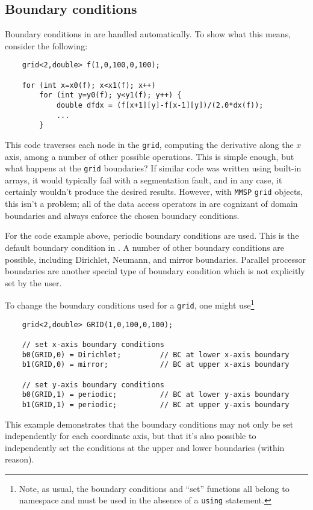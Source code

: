 \subsection{Boundary conditions}
Boundary conditions in \MMSP are handled automatically.  To show what this means, consider the following:
\begin{shadebox}
\begin{verbatim}
    grid<2,double> f(1,0,100,0,100);

    for (int x=x0(f); x<x1(f); x++)
        for (int y=y0(f); y<y1(f); y++) {
            double dfdx = (f[x+1][y]-f[x-1][y])/(2.0*dx(f));
            ...
        }
\end{verbatim}
\end{shadebox}
This code traverses each node in the {\tt grid}, computing the derivative along the $x$ axis, among a number of other possible operations.  This is simple enough, but what happens at the {\tt grid} boundaries?  If similar code was written using built-in arrays, it would typically fail with a segmentation fault, and in any case, it certainly wouldn't produce the desired results.  However, with {\tt MMSP} {\tt grid} objects, this isn't a problem; all of the data access operators in \MMSP are cognizant of domain boundaries and always enforce the chosen boundary conditions.

For the code example above, periodic boundary conditions are used.  This is the default boundary condition in \MMSP.  A number of other boundary conditions are possible, including Dirichlet, Neumann, and mirror boundaries.  Parallel processor boundaries are another special type of boundary condition which is not explicitly set by the user.

To change the boundary conditions used for a {\tt grid}, one might use\footnote{Note, as usual, the boundary conditions and ``set'' functions all belong to namespace \MMSP and must be used in the absence of a {\tt using} statement.}
\begin{shadebox}
\begin{verbatim}
    grid<2,double> GRID(1,0,100,0,100);

    // set x-axis boundary conditions
    b0(GRID,0) = Dirichlet;         // BC at lower x-axis boundary
    b1(GRID,0) = mirror;            // BC at upper x-axis boundary

    // set y-axis boundary conditions
    b0(GRID,1) = periodic;          // BC at lower y-axis boundary
    b1(GRID,1) = periodic;          // BC at upper y-axis boundary
\end{verbatim}
\end{shadebox}
This example demonstrates that the boundary conditions may not only be set independently for each coordinate axis, but that it's also possible to independently set the conditions at the upper and lower boundaries (within reason).



